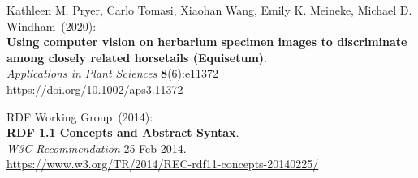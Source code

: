 \begin{thebibliography}{9}
Kathleen M. Pryer, Carlo Tomasi, Xiaohan Wang, Emily K. Meineke, Michael D. Windham~(2020): \\
\textbf{Using computer vision on herbarium specimen images to discriminate among closely related horsetails (Equisetum)}.\\
\emph{Applications in Plant Sciences} \textbf{8}(6):e11372\\
\url{https://doi.org/10.1002/aps3.11372}

RDF Working Group~(2014): \\
\textbf{RDF 1.1 Concepts and Abstract Syntax}.\\
\emph{W3C Recommendation} 25 Feb 2014.\\
\url{https://www.w3.org/TR/2014/REC-rdf11-concepts-20140225/}


\end{thebibliography}
